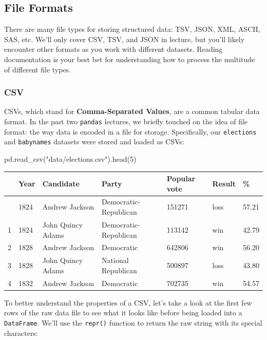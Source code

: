 \documentclass[
  letterpaper,
  DIV=11,
  numbers=noendperiod]{scrreprt}
\newenvironment{Shaded}{\begin{snugshade}}{\end{snugshade}}
\newcommand{\DecValTok}[1]{\textcolor[rgb]{0.68,0.00,0.00}{#1}}
\newcommand{\NormalTok}[1]{\textcolor[rgb]{0.00,0.23,0.31}{#1}}
\newcommand{\StringTok}[1]{\textcolor[rgb]{0.13,0.47,0.30}{#1}}
\begin{document}
\subsection{File Formats}\label{file-formats}

There are many file types for storing structured data: TSV, JSON, XML,
ASCII, SAS, etc. We'll only cover CSV, TSV, and JSON in lecture, but
you'll likely encounter other formats as you work with different
datasets. Reading documentation is your best bet for understanding how
to process the multitude of different file types.

\subsubsection{CSV}\label{csv}

CSVs, which stand for \textbf{Comma-Separated Values}, are a common
tabular data format. In the past two \texttt{pandas} lectures, we
briefly touched on the idea of file format: the way data is encoded in a
file for storage. Specifically, our \texttt{elections} and
\texttt{babynames} datasets were stored and loaded as CSVs:

\begin{Shaded}
\begin{Highlighting}[]
\NormalTok{pd.read\_csv(}\StringTok{"data/elections.csv"}\NormalTok{).head(}\DecValTok{5}\NormalTok{)}
\end{Highlighting}
\end{Shaded}

\begin{longtable}[]{@{}lllllll@{}}
\toprule\noalign{}
& Year & Candidate & Party & Popular vote & Result & \% \\
\midrule\noalign{}
\endhead
\bottomrule\noalign{}
\endlastfoot
0 & 1824 & Andrew Jackson & Democratic-Republican & 151271 & loss &
57.21 \\
1 & 1824 & John Quincy Adams & Democratic-Republican & 113142 & win &
42.79 \\
2 & 1828 & Andrew Jackson & Democratic & 642806 & win & 56.20 \\
3 & 1828 & John Quincy Adams & National Republican & 500897 & loss &
43.80 \\
4 & 1832 & Andrew Jackson & Democratic & 702735 & win & 54.57 \\
\end{longtable}

To better understand the properties of a CSV, let's take a look at the
first few rows of the raw data file to see what it looks like before
being loaded into a \texttt{DataFrame}. We'll use the \texttt{repr()}
function to return the raw string with its special characters:
\end{document}
